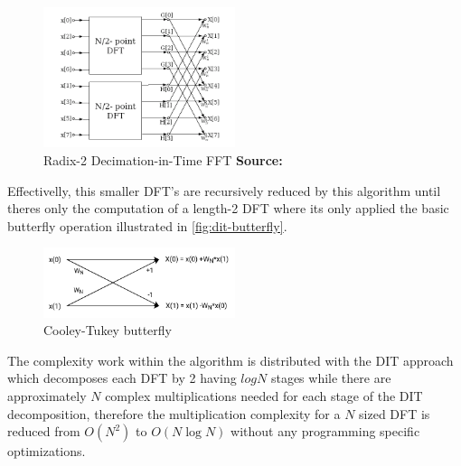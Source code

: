 \documentclass[
  oneside,
  11pt, a4paper,
  footinclude=true,
  headinclude=true,
  cleardoublepage=empty
]{scrbook}
\newcommand*{\source}[1]{%
    \textbf{Source:} \cite{#1}%
}
\begin{document}
\begin{figure}[h] 
    \centering
    \includegraphics[width=0.5\textwidth]{imgs/dit_fft.png}
    \caption{Radix-2 Decimation-in-Time FFT \source{jones2014digital}}
    \label{fig:dit-fft}
\end{figure}


Effectivelly, this smaller DFT's are recursively reduced by this algorithm until theres only the computation of a length-2 DFT where its only applied the basic butterfly operation illustrated in \autoref{fig:dit-butterfly}.

\begin{figure}[h] 
    \centering
    \includegraphics[width=0.5\textwidth]{imgs/dit_butterfly.png}
    \caption{Cooley-Tukey butterfly}
    \label{fig:dit-butterfly}
\end{figure}


The complexity work within the algorithm is distributed with the DIT approach which decomposes each DFT by 2 having \(log N\) stages \cite{smith2007mathematics} while there are approximately \(N\) complex multiplications needed for each stage of the DIT decomposition, therefore the multiplication complexity for a \(N\) sized DFT is reduced from \(O(N^{2})\) to \(O(N \log{N})\) without any programming specific optimizations.
\end{document}
